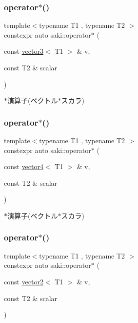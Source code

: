 \subsubsection{\texorpdfstring{operator$\ast$()}{operator*()}\hspace{0.1cm}{\footnotesize\ttfamily [2/14]}}
{\footnotesize\ttfamily template$<$typename T1 , typename T2 $>$ \\
constexpr auto saki\+::operator$\ast$ (\begin{DoxyParamCaption}\item[{const \mbox{\hyperlink{classsaki_1_1vector3}{vector3}}$<$ T1 $>$ \&}]{v,  }\item[{const T2 \&}]{scalar }\end{DoxyParamCaption})}



$\ast$演算子(ベクトル$\ast$スカラ) 

\mbox{\label{namespacesaki_a0fe5418c09468a2435c0a8a85a941174}} 
\subsubsection{\texorpdfstring{operator$\ast$()}{operator*()}\hspace{0.1cm}{\footnotesize\ttfamily [3/14]}}
{\footnotesize\ttfamily template$<$typename T1 , typename T2 $>$ \\
constexpr auto saki\+::operator$\ast$ (\begin{DoxyParamCaption}\item[{const \mbox{\hyperlink{classsaki_1_1vector4}{vector4}}$<$ T1 $>$ \&}]{v,  }\item[{const T2 \&}]{scalar }\end{DoxyParamCaption})}



$\ast$演算子(ベクトル$\ast$スカラ) 

\mbox{\label{namespacesaki_af6d6668922b972ec01303867612e4783}} 
\subsubsection{\texorpdfstring{operator$\ast$()}{operator*()}\hspace{0.1cm}{\footnotesize\ttfamily [4/14]}}
{\footnotesize\ttfamily template$<$typename T1 , typename T2 $>$ \\
constexpr auto saki\+::operator$\ast$ (\begin{DoxyParamCaption}\item[{const \mbox{\hyperlink{classsaki_1_1vector2}{vector2}}$<$ T1 $>$ \&}]{v,  }\item[{const T2 \&}]{scalar }\end{DoxyParamCaption})}



